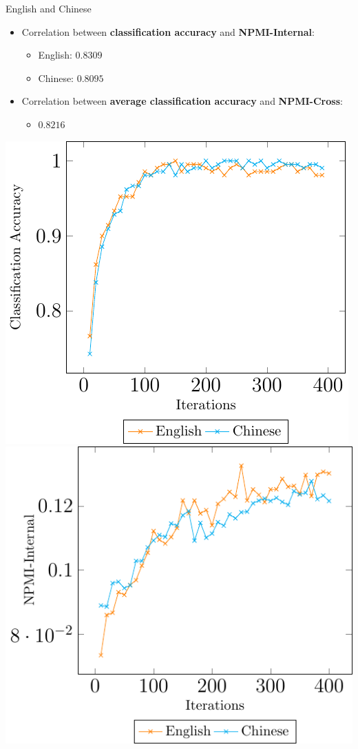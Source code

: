\documentclass[compress]{beamer}
\begin{document}
	\begin{frame}{English and Chinese}
		\begin{itemize}
			\item Correlation between \textbf{classification accuracy} and \textbf{NPMI-Internal}:
			\begin{itemize}
				\item English: $0.8309$
				\item Chinese: $0.8095$
			\end{itemize}
			\item Correlation between \textbf{average classification accuracy} and \textbf{NPMI-Cross}:
			\begin{itemize}
				\item $0.8216$
			\end{itemize}
		\end{itemize}
		\begin{center}
			\includegraphics[height=0.5\textheight]{multilingual_itm/clf-en-cmn.pdf}
			\includegraphics[height=0.5\textheight]{multilingual_itm/npmi-en-cmn.pdf}
		\end{center}
	\end{frame}
\end{document}

